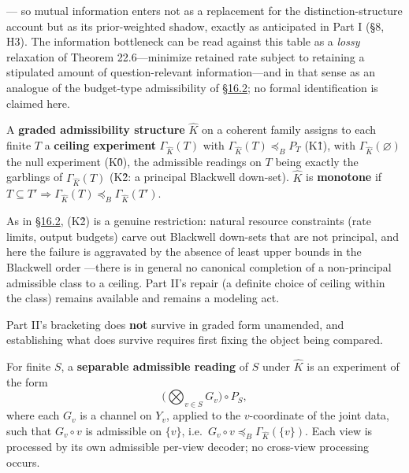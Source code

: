 --- so mutual information enters not as a replacement for the distinction-structure account but as its prior-weighted shadow, exactly as anticipated in Part I (§8, H3). The information bottleneck \autocite{tishby1999} can be read against this table as a \emph{lossy} relaxation of Theorem 22.6---\hspace{0pt}minimize retained rate subject to retaining a stipulated amount of question-relevant information---\hspace{0pt}and in that sense as an analogue of the budget-type admissibility of \hyperlink{sec:16.2}{§16.2}; no formal identification is claimed here.



\begin{thmdef}

A \textbf{graded admissibility structure} \(\widehat K\) on a coherent family assigns to each finite \(T\) a \textbf{ceiling experiment} \(\Gamma_{\widehat K}(T)\) with \(\Gamma_{\widehat K}(T) \preceq_B P_T\) (K1̂), with \(\Gamma_{\widehat K}(\varnothing)\) the null experiment (K0̂), the admissible readings on \(T\) being exactly the garblings of \(\Gamma_{\widehat K}(T)\) (K2̂: a principal Blackwell down-set). \(\widehat K\) is \textbf{monotone} if \(T \subseteq T' \Rightarrow \Gamma_{\widehat K}(T) \preceq_B \Gamma_{\widehat K}(T')\).
\end{thmdef}

As in \hyperlink{sec:16.2}{§16.2}, (K2̂) is a genuine restriction: natural resource constraints (rate limits, output budgets) carve out Blackwell down-sets that are not principal, and here the failure is aggravated by the absence of least upper bounds in the Blackwell order \autocite{bertschinger2014}---\hspace{0pt}there is in general no canonical completion of a non-principal admissible class to a ceiling. Part II's repair (a definite choice of ceiling within the class) remains available and remains a modeling act.

Part II's bracketing does \textbf{not} survive in graded form unamended, and establishing what does survive requires first fixing the object being compared.

\begin{thmdef}

For finite \(S\), a \textbf{separable admissible reading} of \(S\) under \(\widehat K\) is an experiment of the form
\[
\Big(\bigotimes_{v \in S} G_v\Big) \circ P_S,
\]
where each \(G_v\) is a channel on \(Y_v\), applied to the \(v\)-coordinate of the joint data, such that \(G_v \circ v\) is admissible on \(\{v\}\), i.e.~\(G_v \circ v \preceq_B \Gamma_{\widehat K}(\{v\})\). Each view is processed by its own admissible per-view decoder; no cross-view processing occurs.
\end{thmdef}

